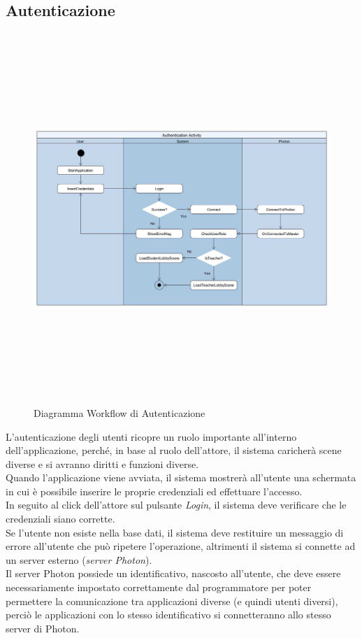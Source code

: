 \subsection{Autenticazione}
\begin{figure}[H]
    \centering
    \includegraphics[width = 17cm, height = 14cm]{Immagini/AuthenticationActivityDiagram1.jpg}
    \caption{Diagramma Workflow di Autenticazione}
    \label{fig:my_label}
\end{figure}
L'autenticazione degli utenti ricopre un ruolo importante all'interno dell'applicazione, perché, in base al ruolo dell'attore, il sistema caricherà scene diverse e si avranno diritti e funzioni diverse.
\\Quando l'applicazione viene avviata, il sistema mostrerà all'utente una schermata in cui è possibile inserire le proprie credenziali ed effettuare l'accesso. 
\\In seguito al click dell'attore sul pulsante \textit{Login}, il sistema deve verificare che le credenziali siano corrette. 
\\Se l'utente non esiste nella base dati, il sistema deve restituire un messaggio di errore all'utente che può ripetere l'operazione, altrimenti il sistema si connette ad un server esterno (\textit{server Photon}).
\\Il server Photon possiede un identificativo, nascosto all'utente, che deve essere necessariamente impostato correttamente dal programmatore per poter permettere la comunicazione tra applicazioni diverse (e quindi utenti diversi), perciò le applicazioni con lo stesso identificativo si connetteranno allo stesso server di Photon.
